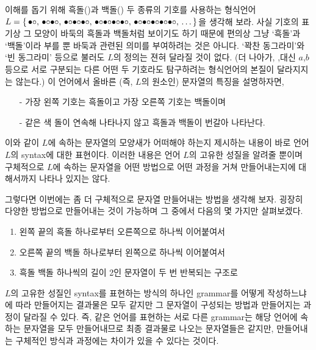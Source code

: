 이해를 돕기 위해 흑돌(\txtbullet)과 백돌(\txtcircle) 두 종류의 기호를 사용하는 형식언어
$L = \{\, {\bullet\circ}
      ,\, {\bullet\circ}{\bullet\circ}
      ,\, {\bullet\circ}{\bullet\circ}{\bullet\circ}
      ,\, {\bullet\circ}{\bullet\circ}{\bullet\circ}{\bullet\circ}
      ,\, {\bullet\circ}{\bullet\circ}{\bullet\circ}{\bullet\circ}{\bullet\circ}
      ,\, \ldots
   \,\}$을 생각해 보라.
사실 기호의 표기상 그 모양이 바둑의 흑돌과 백돌처럼 보이기도 하기 때문에
편의상 그냥 `흑돌'과 `백돌'이라 부를 뿐 바둑과 관련된 의미를 부여하려는
것은 아니다. `꽉찬 동그라미'와 `빈 동그라미' 등으로 불러도
$L$의 정의는 젼혀 달라질 것이 없다. (더 나아가,
\txtbullet,\txtcircle 대신 $a$,$b$ 등으로 서로 구분되는
다른 어떤 두 기호라도 탐구하려는 형식언어의 본질이 달라지지는 않는다.)
이 언어에서 올바른 (즉, $L$의 원소인) 문자열의 특징을 설명하자면,\vspace{-1ex}
\begin{itemize}\tightlist
    \item[-] 가장 왼쪽 기호는 흑돌이고 가장 오른쪽 기호는 백돌이며
    \item[-] 같은 색 돌이 연속해 나타나지 않고 흑돌과 백돌이 번갈아 나타난다.
\end{itemize}
이와 같이 $L$에 속하는 문자열의 모양새가 어떠해야 하는지 제시하는 내용이
바로 언어 $L$의 syntax에 대한 표현이다. 이러한 내용은 언어 $L$의 고유한
성질을 알려줄 뿐이며 구체적으로 $L$에 속하는 문자열을 어떤 방법으로 어떤
과정을 거쳐 만들어내는지에 대해서까지 나타나 있지는 않다.

그렇다면 이번에는 좀 더 구체적으로 문자열 \txtbullet\txtcircle\txtbullet{}
만들어내는 방법을 생각해 보자. 굉장히 다양한 방법으로 만들어내는 것이 가능하며
그 중에서 다음의 몇 가지만 살펴보겠다.
\begin{enumerate}
    \item
    \fbox{\fbox{\fbox{\fbox{\!\txtbullet\!}\,\txtcircle\!}\,\txtbullet\!}\,\txtcircle\!}
    왼쪽 끝의 흑돌 하나로부터 오른쪽으로 하나씩 이어붙여서
    \item
    \fbox{\!\txtbullet\,\fbox{\!\txtcircle\,\fbox{\!\txtbullet\,\fbox{\!\txtcircle\!}}}}
    오른쪽 끝의 백돌 하나로부터 왼쪽으로 하나씩 이어붙여서
    \item
    \fbox{\fbox{\!\fbox{\!\txtbullet\!}\,\txtcircle\!}\,\fbox{\!\fbox{\!\txtbullet\!}\,\txtcircle\!}}
    흑돌 백돌 하나씩의 길이 2인 문자열이 두 번 반복되는 구조로
\end{enumerate}
$L$의 고유한 성질인 syntax를 표현하는 방식의 하나인 grammar를 어떻게 작성하느냐에
따라 만들어지는 결과물은 모두 \txtbullet\txtcircle\txtbullet{} 같지만
그 문자열이 구성되는 방법과 만들어지는 과정이 달라질 수 있다. 즉, 같은 언어를 표현하는
서로 다른 grammar는 해당 언어에 속하는 문자열을 모두 만들어내므로 최종 결과물로 나오는
문자열들은 같지만, 만들어내는 구체적인 방식과 과정에는 차이가 있을 수 있다는 것이다.


